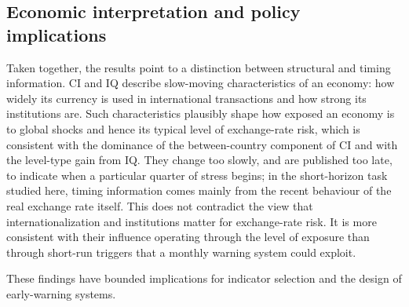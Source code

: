 \documentclass[preprint,12pt,authoryear]{elsarticle}
\begin{document}
\subsection{Economic interpretation and policy implications}
Taken together, the results point to a distinction between structural and timing information. CI and IQ describe slow-moving characteristics of an economy: how widely its currency is used in international transactions and how strong its institutions are. Such characteristics plausibly shape how exposed an economy is to global shocks and hence its typical level of exchange-rate risk, which is consistent with the dominance of the between-country component of CI and with the level-type gain from IQ. They change too slowly, and are published too late, to indicate when a particular quarter of stress begins; in the short-horizon task studied here, timing information comes mainly from the recent behaviour of the real exchange rate itself. This does not contradict the view that internationalization and institutions matter for exchange-rate risk. It is more consistent with their influence operating through the level of exposure than through short-run triggers that a monthly warning system could exploit.

These findings have bounded implications for indicator selection and the design of early-warning systems.
\end{document}
